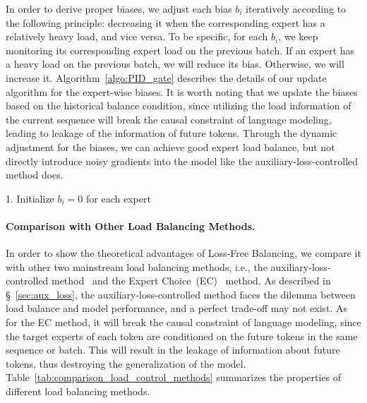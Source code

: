 \documentclass{article}
\newcommand{\ours}{Loss-Free Balancing}
\begin{document}
In order to derive proper biases, we adjust each bias $b_i$ iteratively according to the following principle: decreasing it when the corresponding expert has a relatively heavy load, and vice versa. 
To be specific, for each ${b}_i$, we keep monitoring its corresponding expert load on the previous batch. 
If an expert has a heavy load on the previous batch, we will reduce its bias. 
Otherwise, we will increase it. 
Algorithm~\ref{algo:PID_gate} describes the details of our update algorithm for the expert-wise biases.
It is worth noting that we update the biases based on the historical balance condition, since utilizing the load information of the current sequence will break the causal constraint of language modeling, leading to leakage of the information of future tokens. 
Through the dynamic adjustment for the biases, we can achieve good expert load balance, but not directly introduce noisy gradients into the model like the auxiliary-loss-controlled method does. 

\begin{algorithm}[t]
\SetAlgoLined
1. Initialize $b_i = 0$ for each expert\;

\caption{Adjusting the per-expert bias ${b}_i$ during training}
\label{algo:PID_gate}
\end{algorithm}

\paragraph{Comparison with Other Load Balancing Methods.}

In order to show the theoretical advantages of \ours{}, we compare it with other two mainstream load balancing methods, i.e., the auxiliary-loss-controlled method~\citep{Lepikhin2020GShardSG,Fedus2021SwitchTS} and the Expert Choice~(EC)~\citep{Zhou2022MixtureofExpertsWE} method. 
As described in \S~\ref{sec:aux_loss}, the auxiliary-loss-controlled method faces the dilemma between load balance and model performance, and a perfect trade-off may not exist. 
As for the EC method, it will break the causal constraint of language modeling, since the target experts of each token are conditioned on the future tokens in the same sequence or batch. 
This will result in the leakage of information about future tokens, thus destroying the generalization of the model. 
Table~\ref{tab:comparison_load_control_methods} summarizes the properties of different load balancing methods.
\end{document}
